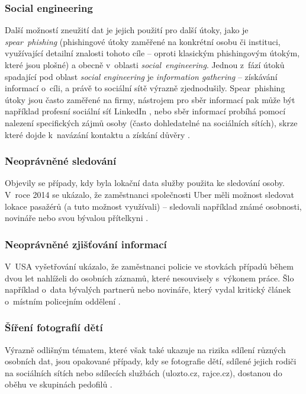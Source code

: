 \subsubsection*{Social engineering}
Další možností zneužití dat je jejich použití pro další útoky, jako je \textit{spear~phishing} (phishingové útoky zaměřené na konkrétní osobu či instituci, využívající detailní znalosti tohoto cíle -- oproti klasickým phishingovým útokým, které jsou plošné) a obecně v~oblasti \textit{social~engineering}. Jednou z~fází  útoků spadající pod oblast \textit{social engineering} je \textit{information gathering} -- získávání informací o~cíli, a právě to sociální sítě výrazně zjednodušily. Spear~phishing útoky jsou často zaměřené na firmy, nástrojem pro sběr informací pak může být například profesní sociální síť LinkedIn \citep{social-engineering-tools}, nebo sběr informací probíhá pomocí nalezení specifických zájmů osoby (často dohledatelné na sociálních sítích), skrze které dojde k~navázání kontaktu a získání důvěry \citep{social-engineering-book}.

\subsubsection*{Neoprávněné sledování}
Objevily se případy, kdy byla lokační data služby použita ke sledování osoby. V~roce 2014 se ukázalo, že zaměstnanci společnosti Uber měli možnost sledovat lokace pasažérů (a tuto možnost využívali) -- sledovali například známé osobnosti, novináře nebo svou bývalou přítelkyni \citep{uber-spying}.

\subsubsection*{Neoprávněné zjišťování informací}
V~USA vyšetřování ukázalo, že zaměstnanci policie ve stovkách případů během dvou let nahlíželi do osobních záznamů, které nesouvisely s~výkonem práce. Šlo například o~data bývalých partnerů nebo novináře, který vydal kritický článek o~místním policejním oddělení \citep{police-spying}. 

\subsubsection*{Šíření fotografií dětí}
Výrazně odlišným tématem, které však také ukazuje na rizika sdílení různých osobních dat, jsou opakované případy, kdy se fotografie dětí, sdílené jejich rodiči na sociálních sítích nebo sdílecích službách (ulozto.cz, rajce.cz), dostanou do oběhu ve skupinách pedofilů \citep{pedophiles-web}.

